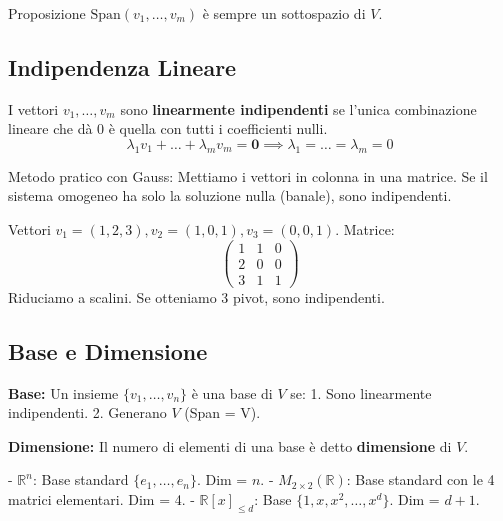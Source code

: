 \begin{concept}{Proposizione}
$\text{Span}(v_1, \dots, v_m)$ è sempre un sottospazio di $V$.
\end{concept}

\subsection{Indipendenza Lineare}
\begin{definitionbox}
I vettori $v_1, \dots, v_m$ sono \textbf{linearmente indipendenti} se l'unica combinazione lineare che dà 0 è quella con tutti i coefficienti nulli.
$$ \lambda_1 v_1 + \dots + \lambda_m v_m = \mathbf{0} \implies \lambda_1 = \dots = \lambda_m = 0 $$
\end{definitionbox}

Metodo pratico con Gauss: Mettiamo i vettori in colonna in una matrice. Se il sistema omogeneo ha solo la soluzione nulla (banale), sono indipendenti.

\begin{exercisebox}[title={Esempio Verifica Indipendenza}]
Vettori $v_1=(1,2,3), v_2=(1,0,1), v_3=(0,0,1)$.
Matrice:
$$ \begin{pmatrix} 1 & 1 & 0 \\ 2 & 0 & 0 \\ 3 & 1 & 1 \end{pmatrix} $$
Riduciamo a scalini. Se otteniamo 3 pivot, sono indipendenti.
\end{exercisebox}

\subsection{Base e Dimensione}
\begin{definitionbox}
\textbf{Base:} Un insieme $\{v_1, \dots, v_n\}$ è una base di $V$ se:
1. Sono linearmente indipendenti.
2. Generano $V$ (Span = V).
\end{definitionbox}

\begin{definitionbox}
\textbf{Dimensione:} Il numero di elementi di una base è detto \textbf{dimensione} di $V$.
\end{definitionbox}

\begin{exercisebox}[title={Esempi di Basi}]
- $\mathbb{R}^n$: Base standard $\{e_1, \dots, e_n\}$. Dim = $n$.
- $M_{2 \times 2}(\mathbb{R})$: Base standard con le 4 matrici elementari. Dim = 4.
- $\mathbb{R}[x]_{\le d}$: Base $\{1, x, x^2, \dots, x^d\}$. Dim = $d+1$.
\end{exercisebox}

